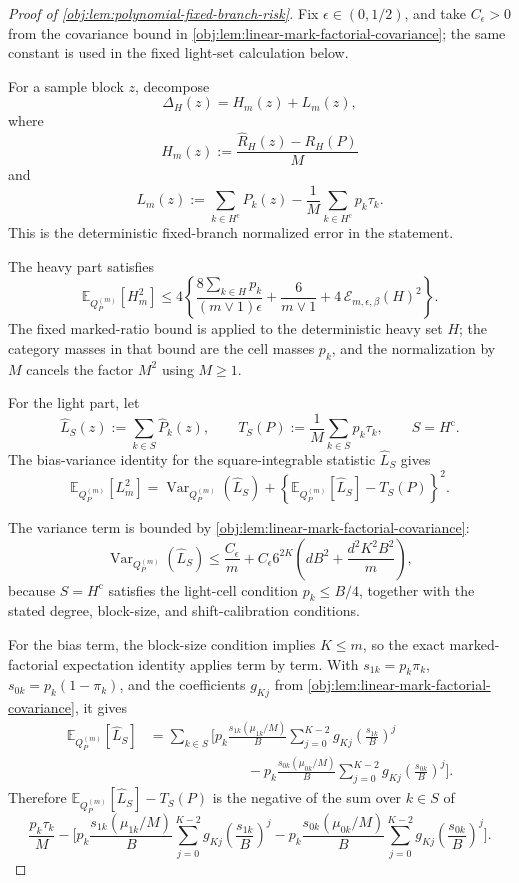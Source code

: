 \documentclass[11pt]{article}
\begin{document}
\begin{proof}[Proof of \cref{obj:lem:polynomial-fixed-branch-risk}]
Fix \(\epsilon\in(0,1/2)\), and take \(C_\epsilon>0\) from the covariance bound in \cref{obj:lem:linear-mark-factorial-covariance}; the same constant is used in the fixed light-set calculation below. %

For a sample block \(z\), decompose
\[
\Delta_H(z)=H_m(z)+L_m(z),
\]
where
\[
H_m(z):=\frac{\widehat R_H(z)-R_H(P)}{M}
\]
and
\[
L_m(z):=
\sum_{k\in H^{\mathrm c}}\widehat P_k(z)
-\frac1M\sum_{k\in H^{\mathrm c}}p_k\tau_k .
\]
This is the deterministic fixed-branch normalized error in the statement. %

The heavy part satisfies
\[
\mathbb E_{Q_P^{(m)}}[H_m^2]
\le
4\left\{
\frac{8\sum_{k\in H}p_k}{(m\vee1)\epsilon}
+\frac{6}{m\vee1}
+4\,\mathcal E_{m,\epsilon,\beta}(H)^2
\right\}.
\]
The fixed marked-ratio bound is applied to the deterministic heavy set \(H\); the category masses in that bound are the cell masses \(p_k\), and the normalization by \(M\) cancels the factor \(M^2\) using \(M\ge1\). %

For the light part, let
\[
\widehat L_S(z):=\sum_{k\in S}\widehat P_k(z),
\qquad
T_S(P):=\frac1M\sum_{k\in S}p_k\tau_k,
\qquad S=H^{\mathrm c}.
\]
The bias-variance identity for the square-integrable statistic \(\widehat L_S\) gives
\[
\mathbb E_{Q_P^{(m)}}[L_m^2]
=
\operatorname{Var}_{Q_P^{(m)}}(\widehat L_S)
+
\left\{
\mathbb E_{Q_P^{(m)}}[\widehat L_S]-T_S(P)
\right\}^2 .
\]

The variance term is bounded by \cref{obj:lem:linear-mark-factorial-covariance}:
\[
\operatorname{Var}_{Q_P^{(m)}}(\widehat L_S)
\le
\frac{C_\epsilon}{m}
+
C_\epsilon6^{2K}
\left(dB^2+\frac{d^2K^2B^2}{m}\right),
\]
because \(S=H^{\mathrm c}\) satisfies the light-cell condition \(p_k\le B/4\), together with the stated degree, block-size, and shift-calibration conditions. %

For the bias term, the block-size condition implies \(K\le m\), so the exact marked-factorial expectation identity applies term by term. With \(s_{1k}=p_k\pi_k\), \(s_{0k}=p_k(1-\pi_k)\), and the coefficients \(g_{Kj}\) from \cref{obj:lem:linear-mark-factorial-covariance}, it gives
\[
\begin{aligned}
\mathbb E_{Q_P^{(m)}}[\widehat L_S]
&=
\sum_{k\in S}
\Bigg[
 p_k\frac{s_{1k}(\mu_{1k}/M)}{B}
 \sum_{j=0}^{K-2}g_{Kj}\left(\frac{s_{1k}}{B}\right)^j \\
&\hspace{7em}{}-
 p_k\frac{s_{0k}(\mu_{0k}/M)}{B}
 \sum_{j=0}^{K-2}g_{Kj}\left(\frac{s_{0k}}{B}\right)^j
\Bigg].
\end{aligned}
\]
Therefore \(\mathbb E_{Q_P^{(m)}}[\widehat L_S]-T_S(P)\) is the negative of the sum over \(k\in S\) of
\[
\frac{p_k\tau_k}{M}
-
\Bigg[
 p_k\frac{s_{1k}(\mu_{1k}/M)}{B}
 \sum_{j=0}^{K-2}g_{Kj}\left(\frac{s_{1k}}{B}\right)^j
-
 p_k\frac{s_{0k}(\mu_{0k}/M)}{B}
 \sum_{j=0}^{K-2}g_{Kj}\left(\frac{s_{0k}}{B}\right)^j
\Bigg].
\]


\end{proof}
\end{document}
